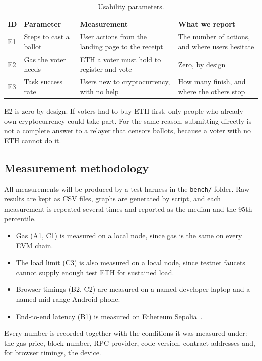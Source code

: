 \begin{table}[htbp]
  \centering
  \caption{Usability parameters.}
  \label{tab:eval-use}
  \small
  \begin{tabular}{@{}lL{4.3cm}L{5.0cm}L{5.0cm}@{}}
    \toprule
    \textbf{ID} & \textbf{Parameter}     & \textbf{Measurement}                       & \textbf{What we report} \\
    \midrule
    E1          & Steps to cast a ballot & User actions from the landing page to the receipt  & The number of actions, and where users hesitate \\
    E2          & Gas the voter needs    & ETH a voter must hold to register and vote & Zero, by design \\
    E3          & Task success rate      & Users new to cryptocurrency, with no help  & How many finish, and where the others stop \\
    \bottomrule
  \end{tabular}
\end{table}

E2 is zero by design. If voters had to buy ETH first, only people who already
own cryptocurrency could take part. For the same reason, submitting directly is
not a complete answer to a relayer that censors ballots, because a voter with
no ETH cannot do it.

\subsection{Measurement methodology}

All measurements will be produced by a test harness in the \texttt{bench/}
folder. Raw results are kept as CSV files, graphs are generated by script, and
each measurement is repeated several times and reported as the median and the
95th percentile.

\begin{itemize}
  \item Gas (A1, C1) is measured on a local node, since gas is the same on
        every EVM chain.
  \item The load limit (C3) is also measured on a local node, since testnet
        faucets cannot supply enough test ETH for sustained load.
  \item Browser timings (B2, C2) are measured on a named developer laptop and a
        named mid-range Android phone.
  \item End-to-end latency (B1) is measured on Ethereum Sepolia~\cite{sepolia}.
\end{itemize}

Every number is recorded together with the conditions it was measured under:
the gas price, block number, RPC provider, code version, contract addresses
and, for browser timings, the device.
